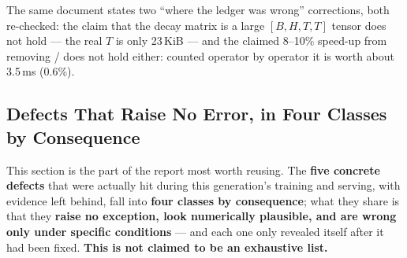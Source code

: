 The same document states two ``where the ledger was wrong'' corrections, both re-checked: the
claim that the decay matrix is a large $[B,H,T,T]$ tensor does not hold --- the real $T$ is only
23\,KiB --- and the claimed 8--10\% speed-up from removing /
does not hold either: counted operator by operator it is worth about 3.5\,ms (0.6\%).

\subsection{Defects That Raise No Error, in Four Classes by Consequence}

This section is the part of the report most worth reusing. The \textbf{five concrete defects}
that were actually hit during this generation's training and serving, with evidence left behind,
fall into \textbf{four classes by consequence}; what they share is that they \textbf{raise no
exception, look numerically plausible, and are wrong only under specific conditions} --- and each
one only revealed itself after it had been fixed. \textbf{This is not claimed to be an exhaustive
list.}

